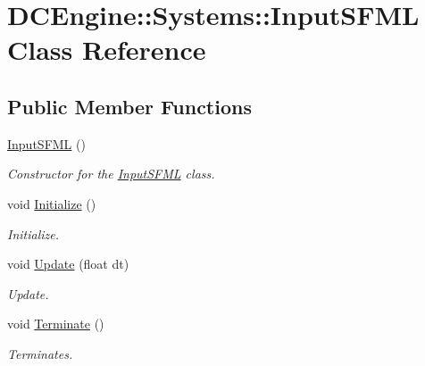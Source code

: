 \hypertarget{classDCEngine_1_1Systems_1_1InputSFML}{\section{D\-C\-Engine\-:\-:Systems\-:\-:Input\-S\-F\-M\-L Class Reference}
\label{classDCEngine_1_1Systems_1_1InputSFML}
}
\subsection*{Public Member Functions}
\begin{DoxyCompactItemize}
\item 
\hypertarget{classDCEngine_1_1Systems_1_1InputSFML_a4c038e91d4d06755f74574ef12d03311}{\hyperlink{classDCEngine_1_1Systems_1_1InputSFML_a4c038e91d4d06755f74574ef12d03311}{Input\-S\-F\-M\-L} ()}\label{classDCEngine_1_1Systems_1_1InputSFML_a4c038e91d4d06755f74574ef12d03311}

\begin{DoxyCompactList}\small\item\em Constructor for the \hyperlink{classDCEngine_1_1Systems_1_1InputSFML}{Input\-S\-F\-M\-L} class. \end{DoxyCompactList}\item 
\hypertarget{classDCEngine_1_1Systems_1_1InputSFML_a4b952d0cfd3c9bfe262bc52fb0875130}{void \hyperlink{classDCEngine_1_1Systems_1_1InputSFML_a4b952d0cfd3c9bfe262bc52fb0875130}{Initialize} ()}\label{classDCEngine_1_1Systems_1_1InputSFML_a4b952d0cfd3c9bfe262bc52fb0875130}

\begin{DoxyCompactList}\small\item\em Initialize. \end{DoxyCompactList}\item 
\hypertarget{classDCEngine_1_1Systems_1_1InputSFML_aae1a693756f4096123b90a4352dc92f1}{void \hyperlink{classDCEngine_1_1Systems_1_1InputSFML_aae1a693756f4096123b90a4352dc92f1}{Update} (float dt)}\label{classDCEngine_1_1Systems_1_1InputSFML_aae1a693756f4096123b90a4352dc92f1}

\begin{DoxyCompactList}\small\item\em Update. \end{DoxyCompactList}\item 
\hypertarget{classDCEngine_1_1Systems_1_1InputSFML_af1a180e84e38e7f3566c577f05de4336}{void \hyperlink{classDCEngine_1_1Systems_1_1InputSFML_af1a180e84e38e7f3566c577f05de4336}{Terminate} ()}\label{classDCEngine_1_1Systems_1_1InputSFML_af1a180e84e38e7f3566c577f05de4336}

\begin{DoxyCompactList}\small\item\em Terminates. \end{DoxyCompactList}\end{DoxyCompactItemize}
